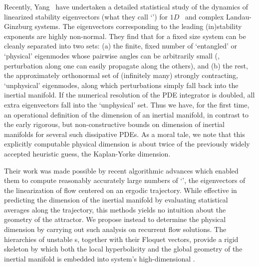 \begin{description}
                                                        \toCB
Recently, Yang~\etal{} have undertaken a detailed
statistical study of the dynamics of linearized stability eigenvectors
(what they call `{\cLvs}') for $1D$ \KS\ and complex Landau-Ginzburg
systems. The eigenvectors corresponding to the leading (in)stability
exponents are highly non-normal. They find that for a fixed size system
{\cLvs} can be cleanly separated into two sets: (a) the finite, fixed
number of `entangled' or `physical' eigenmodes whose pairwise angles
can be arbitrarily small (\ie, perturbation along one can easily
propagate along the others), and (b) the rest, the approximately
orthonormal set  of (infinitely many) strongly contracting, `unphysical'
eigenmodes, along which perturbations simply fall back into the inertial
manifold. If the numerical resolution of the PDE integrator is doubled,
all extra eigenvectors fall into the `unphysical' set. Thus we have, for
the first time, an operational definition of the dimension of an inertial
manifold, in contrast to the early rigorous, but non-constructive bounds
on dimension of inertial manifolds for several such dissipative
PDEs. As a moral tale, we note that this
explicitly computable physical dimension is about twice of the previously
widely accepted heuristic guess, the Kaplan-Yorke
dimension.

Their work was made possible by recent algorithmic
advances\cite{ginelli-2007-99,WoSa07} which enabled them to compute
reasonably accurately large numbers of `{\cLvs}', the eigenvectors of the
linearization of flow centered on an ergodic trajectory. While effective
in predicting the dimension of the inertial manifold by evaluating statistical
averages along the trajectory, this methods yields no intuition about the
geometry of the attractor. We propose instead to determine the physical
dimension by carrying out such analysis on recurrent flow solutions. The
hierarchies of unstable \po s, together with their Floquet vectors,
provide a rigid skeleton by which both the local hyperbolicity and the
global geometry of the inertial manifold is embedded into system's
high-dimensional \statesp.


\end{description}
